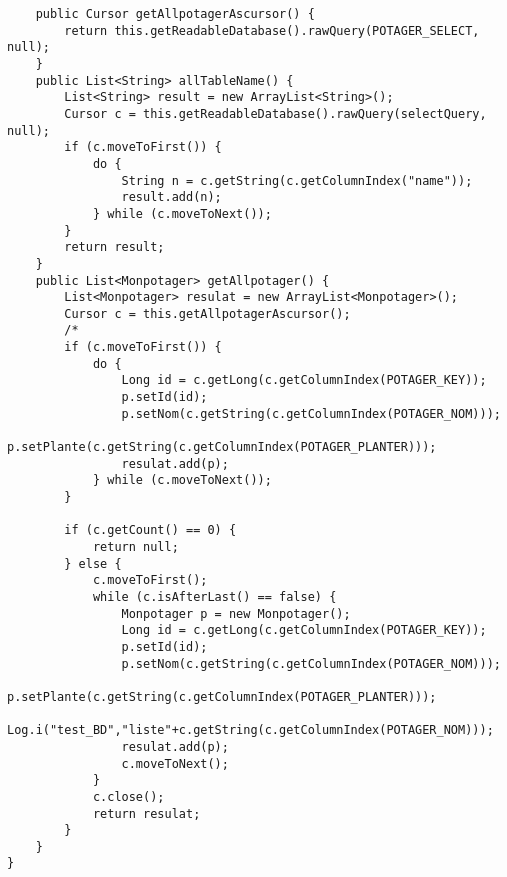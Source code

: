 \begin{lstlisting}
    public Cursor getAllpotagerAscursor() {
        return this.getReadableDatabase().rawQuery(POTAGER_SELECT, null);
    }
    public List<String> allTableName() {
        List<String> result = new ArrayList<String>();
        Cursor c = this.getReadableDatabase().rawQuery(selectQuery, null);
        if (c.moveToFirst()) {
            do {
                String n = c.getString(c.getColumnIndex("name"));
                result.add(n);
            } while (c.moveToNext());
        }
        return result;
    }
    public List<Monpotager> getAllpotager() {
        List<Monpotager> resulat = new ArrayList<Monpotager>();
        Cursor c = this.getAllpotagerAscursor();
        /*
        if (c.moveToFirst()) {
            do {
                Long id = c.getLong(c.getColumnIndex(POTAGER_KEY));
                p.setId(id);
                p.setNom(c.getString(c.getColumnIndex(POTAGER_NOM)));
                p.setPlante(c.getString(c.getColumnIndex(POTAGER_PLANTER)));
                resulat.add(p);
            } while (c.moveToNext());
        }
      
        if (c.getCount() == 0) {
            return null;
        } else {
            c.moveToFirst();
            while (c.isAfterLast() == false) {
                Monpotager p = new Monpotager();
                Long id = c.getLong(c.getColumnIndex(POTAGER_KEY));
                p.setId(id);
                p.setNom(c.getString(c.getColumnIndex(POTAGER_NOM)));
                p.setPlante(c.getString(c.getColumnIndex(POTAGER_PLANTER)));
                Log.i("test_BD","liste"+c.getString(c.getColumnIndex(POTAGER_NOM)));
                resulat.add(p);
                c.moveToNext();
            }
            c.close();
            return resulat;
        }
    }
}
		\end{lstlisting}
